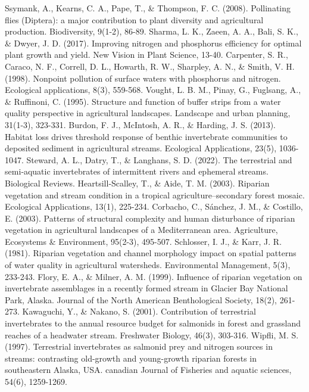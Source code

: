 \documentclass[12pt,a4wide]{report}
\numberwithin{equation}{chapter}
\numberwithin{theorem}{chapter}
\begin{document}
\begin{thebibliography}{99}
  Ssymank, A., Kearns, C. A., Pape, T., \& Thompson, F. C. (2008). Pollinating flies (Diptera): a major contribution to plant diversity and agricultural production. Biodiversity, 9(1-2), 86-89.
   Sharma, L. K., Zaeen, A. A., Bali, S. K., \& Dwyer, J. D. (2017). Improving nitrogen and phosphorus efficiency for optimal plant growth and yield. New Vision in Plant Science, 13-40.
  Carpenter, S. R., Caraco, N. F., Correll, D. L., Howarth, R. W., Sharpley, A. N., \& Smith, V. H. (1998). Nonpoint pollution of surface waters with phosphorus and nitrogen. Ecological applications, 8(3), 559-568.
  Vought, L. B. M., Pinay, G., Fuglsang, A., \& Ruffinoni, C. (1995). Structure and function of buffer strips from a water quality perspective in agricultural landscapes. Landscape and urban planning, 31(1-3), 323-331.
  Burdon, F. J., McIntosh, A. R., \& Harding, J. S. (2013). Habitat loss drives threshold response of benthic invertebrate communities to deposited sediment in agricultural streams. Ecological Applications, 23(5), 1036-1047.
  Steward, A. L., Datry, T., \& Langhans, S. D. (2022). The terrestrial and semi‐aquatic invertebrates of intermittent rivers and ephemeral streams. Biological Reviews.
  Heartsill-Scalley, T., \& Aide, T. M. (2003). Riparian vegetation and stream condition in a tropical agriculture–secondary forest mosaic. Ecological Applications, 13(1), 225-234.
  Corbacho, C., Sánchez, J. M., \& Costillo, E. (2003). Patterns of structural complexity and human disturbance of riparian vegetation in agricultural landscapes of a Mediterranean area. Agriculture, Ecosystems \& Environment, 95(2-3), 495-507.
  Schlosser, I. J., \& Karr, J. R. (1981). Riparian vegetation and channel morphology impact on spatial patterns of water quality in agricultural watersheds. Environmental Management, 5(3), 233-243.
Flory, E. A., \& Milner, A. M. (1999). Influence of riparian vegetation on invertebrate assemblages in a recently formed stream in Glacier Bay National Park, Alaska. Journal of the North American Benthological Society, 18(2), 261-273.
  Kawaguchi, Y., \& Nakano, S. (2001). Contribution of terrestrial invertebrates to the annual resource budget for salmonids in forest and grassland reaches of a headwater stream. Freshwater Biology, 46(3), 303-316.
  Wipfli, M. S. (1997). Terrestrial invertebrates as salmonid prey and nitrogen sources in streams: contrasting old-growth and young-growth riparian forests in southeastern Alaska, USA. canadian Journal of Fisheries and aquatic sciences, 54(6), 1259-1269.

\end{thebibliography}
\end{document}
